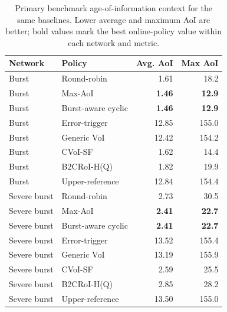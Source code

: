 \begin{table}[t]
\centering
\caption{Primary benchmark age-of-information context for the same baselines. Lower average and maximum AoI are better; bold values mark the best online-policy value within each network and metric.}
\label{tab:standard_baselines_aoi}
\begin{tabular}{llrr}
\hline
Network & Policy & Avg. AoI & Max AoI \\
\hline
Burst & Round-robin & 1.61 & 18.2 \\
Burst & Max-AoI & \textbf{1.46} & \textbf{12.9} \\
Burst & Burst-aware cyclic & \textbf{1.46} & \textbf{12.9} \\
Burst & Error-trigger & 12.85 & 155.0 \\
Burst & Generic VoI & 12.42 & 154.2 \\
Burst & CVoI-SF & 1.62 & 14.4 \\
Burst & B2CRoI-H(Q) & 1.82 & 19.9 \\
Burst & Upper-reference & 12.84 & 154.4 \\
\hline
Severe burst & Round-robin & 2.73 & 30.5 \\
Severe burst & Max-AoI & \textbf{2.41} & \textbf{22.7} \\
Severe burst & Burst-aware cyclic & \textbf{2.41} & \textbf{22.7} \\
Severe burst & Error-trigger & 13.52 & 155.4 \\
Severe burst & Generic VoI & 13.19 & 155.9 \\
Severe burst & CVoI-SF & 2.59 & 25.5 \\
Severe burst & B2CRoI-H(Q) & 2.85 & 28.2 \\
Severe burst & Upper-reference & 13.50 & 155.0 \\
\hline
\end{tabular}
\end{table}
